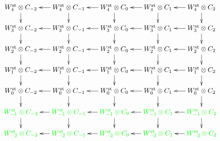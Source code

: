 
\[
	\xymatrix@R=.5cm@C=.5cm{
		\Wst[4]\otimes C_{-2}\ar[d] &
		\Wst[4]\otimes C_{-1}\ar[d]\ar[l] &
		\Wst[4]\otimes C_{0}\ar[d]\ar[l] &
		\Wst[4]\otimes C_{1}\ar[d]\ar[l] &
		\Wst[4]\otimes C_{2}\ar[d]\ar[l]
		\\
		\Wst[3]\otimes C_{-2}\ar[d] &
		\Wst[3]\otimes C_{-1}\ar[d]\ar[l] &
		\Wst[3]\otimes C_{0}\ar[d]\ar[l] &
		\Wst[3]\otimes C_{1}\ar[d]\ar[l] &
		\Wst[3]\otimes C_{2}\ar[d]\ar[l]
		\\
		\Wst[2]\otimes C_{-2}\ar[d] &
		\Wst[2]\otimes C_{-1}\ar[d]\ar[l] &
		\Wst[2]\otimes C_{0}\ar[d]\ar[l] &
		\Wst[2]\otimes C_{1}\ar[d]\ar[l] &
		\Wst[2]\otimes C_{2}\ar[d]\ar[l]
		\\
		\Wst[1]\otimes C_{-2}\ar[d] &
		\Wst[1]\otimes C_{-1}\ar[d]\ar[l] &
		\Wst[1]\otimes C_{0}\ar[d]\ar[l] &
		\Wst[1]\otimes C_{1}\ar[d]\ar[l] &
		\Wst[1]\otimes C_{2}\ar[d]\ar[l]
		\\
		\Wst[0]\otimes C_{-2}\ar[d] &
		\Wst[0]\otimes C_{-1}\ar[d]\ar[l] &
		\Wst[0]\otimes C_{0}\ar[d]\ar[l] &
		\Wst[0]\otimes C_{1}\ar[d]\ar[l] &
		\Wst[0]\otimes C_{2}\ar[d]\ar[l]
		\\
		\green{\Wst[-1]\otimes C_{-2}}\ar[d] &
		\green{\Wst[-1]\otimes C_{-1}}\ar[d]\ar[l] &
		\green{\Wst[-1]\otimes C_{0}}\ar[d]\ar[l] &
		\green{\Wst[-1]\otimes C_{1}}\ar[d]\ar[l] &
		\green{\Wst[-1]\otimes C_{2}}\ar[d]\ar[l]
		\\
		\green{\Wst[-2]\otimes C_{-2}} &
		\green{\Wst[-2]\otimes C_{-1}}\ar[l] &
		\green{\Wst[-2]\otimes C_{0}}\ar[l] &
		\green{\Wst[-2]\otimes C_{1}}\ar[l] &
		\green{\Wst[-2]\otimes C_{2}}\ar[l]
}
\]
